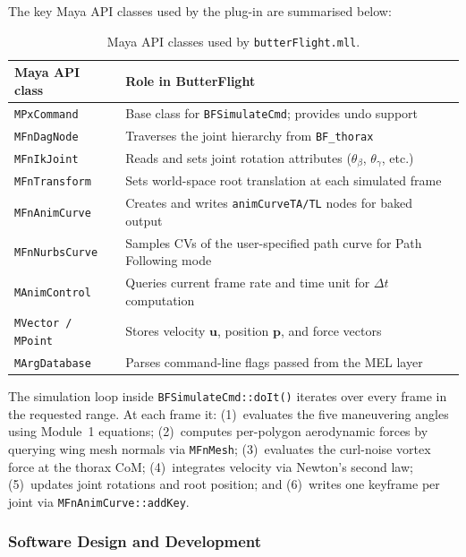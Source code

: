 \documentclass[12pt]{article}
\begin{document}
The key Maya API classes used by the plug-in are summarised below:

\begin{table}[H]
\centering\small
\begin{tabular}{|l|l|}
\hline
\textbf{Maya API class} & \textbf{Role in ButterFlight} \\
\hline
\texttt{MPxCommand}       & Base class for \texttt{BFSimulateCmd}; provides undo support \\
\texttt{MFnDagNode}       & Traverses the joint hierarchy from \texttt{BF\_thorax} \\
\texttt{MFnIkJoint}       & Reads and sets joint rotation attributes ($\theta_\beta$, $\theta_\gamma$, etc.) \\
\texttt{MFnTransform}     & Sets world-space root translation at each simulated frame \\
\texttt{MFnAnimCurve}     & Creates and writes \texttt{animCurveTA/TL} nodes for baked output \\
\texttt{MFnNurbsCurve}    & Samples CVs of the user-specified path curve for Path Following mode \\
\texttt{MAnimControl}     & Queries current frame rate and time unit for $\Delta t$ computation \\
\texttt{MVector / MPoint} & Stores velocity $\mathbf{u}$, position $\mathbf{p}$, and force vectors \\
\texttt{MArgDatabase}     & Parses command-line flags passed from the MEL layer \\
\hline
\end{tabular}
\caption{Maya API classes used by \texttt{butterFlight.mll}.}
\label{tab:api}
\end{table}

The simulation loop inside \texttt{BFSimulateCmd::doIt()} iterates over every
frame in the requested range. At each frame it: (1)~evaluates the five maneuvering
angles using Module~1 equations; (2)~computes per-polygon aerodynamic forces by
querying wing mesh normals via \texttt{MFnMesh}; (3)~evaluates the curl-noise
vortex force at the thorax CoM; (4)~integrates velocity via Newton's second law;
(5)~updates joint rotations and root position; and (6)~writes one keyframe per
joint via \texttt{MFnAnimCurve::addKey}.

\subsubsection{Software Design and Development}
\end{document}
